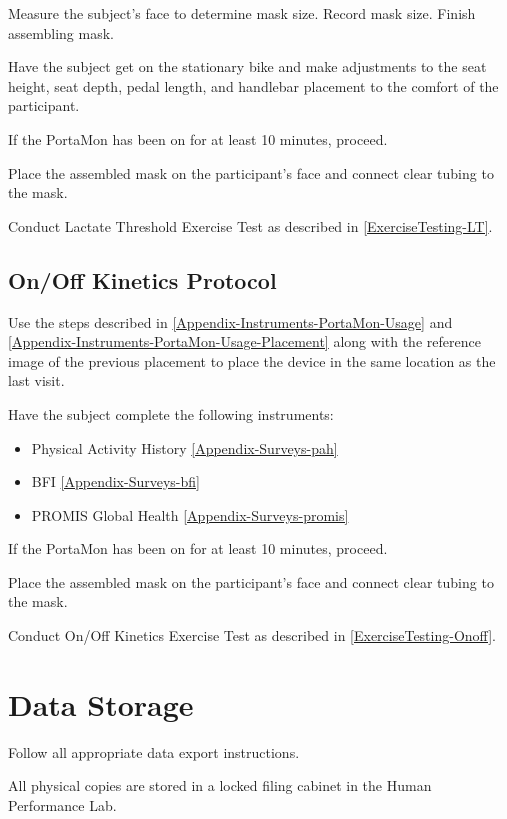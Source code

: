 \documentclass[
]{book}
\providecommand{\tightlist}{%
  \setlength{\itemsep}{0pt}\setlength{\parskip}{0pt}}
\begin{document}
Measure the subject's face to determine mask size. Record mask size. Finish assembling mask.

Have the subject get on the stationary bike and make adjustments to the seat height, seat depth, pedal length, and handlebar placement to the comfort of the participant.

If the PortaMon has been on for at least 10 minutes, proceed.

Place the assembled mask on the participant's face and connect clear tubing to the mask.

Conduct Lactate Threshold Exercise Test as described in \ref{ExerciseTesting-LT}.

\hypertarget{Methods-Onoff}{%
\section{On/Off Kinetics Protocol}\label{Methods-Onoff}}

Use the steps described in \ref{Appendix-Instruments-PortaMon-Usage} and \ref{Appendix-Instruments-PortaMon-Usage-Placement} along with the reference image of the previous placement to place the device in the same location as the last visit.

Have the subject complete the following instruments:

\begin{itemize}
\tightlist
\item
  Physical Activity History \ref{Appendix-Surveys-pah}
\item
  BFI \ref{Appendix-Surveys-bfi}
\item
  PROMIS Global Health \ref{Appendix-Surveys-promis}
\end{itemize}

If the PortaMon has been on for at least 10 minutes, proceed.

Place the assembled mask on the participant's face and connect clear tubing to the mask.

Conduct On/Off Kinetics Exercise Test as described in \ref{ExerciseTesting-Onoff}.

\hypertarget{DataStorage}{%
\chapter{Data Storage}\label{DataStorage}}

Follow all appropriate data export instructions.

All physical copies are stored in a locked filing cabinet in the Human Performance Lab.
\end{document}
